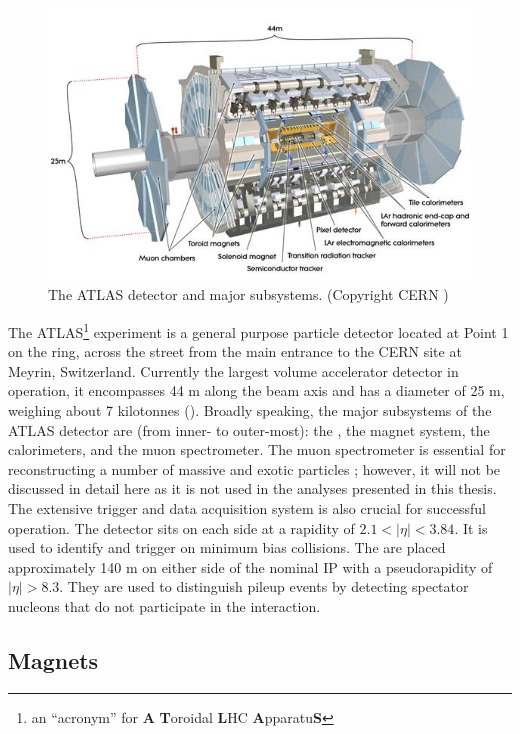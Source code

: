 \begin{figure}[t]
\includegraphics{ATLAS_layout.jpg}
\caption{The ATLAS detector and major subsystems. (Copyright CERN \cite{Pequenao:1095924})}
\label{fig:atlas_layout}
\end{figure}

The ATLAS\footnote{an ``acronym'' for \textbf{A} \textbf{T}oroidal \textbf{L}HC \textbf{A}pparatu\textbf{S}} experiment is a general purpose particle detector \cite{Aad:2008zzm} located at Point 1 on the \lhc ring, across the street from the main entrance to the CERN site at Meyrin, Switzerland.
Currently the largest volume accelerator detector in operation, it encompasses 44 m along the beam axis and has a diameter of 25 m, weighing about 7 kilotonnes ().
Broadly speaking, the major subsystems of the ATLAS detector are (from inner- to outer-most): the \id, the magnet system, the calorimeters, and the muon spectrometer.
The muon spectrometer is essential for reconstructing a number of massive and exotic particles \cite{ATLAS:1997ad}; however, it will not be discussed in detail here as it is not used in the analyses presented in this thesis.
The extensive trigger and data acquisition system is also crucial for successful operation.
The \mbts detector sits on each side at a rapidity of $2.1 < |\eta| < 3.84$.
It is used to identify and trigger on minimum bias collisions.
The \zdc are placed approximately 140 m on either side of the nominal \ac{IP} with a pseudorapidity of $|\eta| > 8.3$.
They are used to distinguish pileup events by detecting spectator nucleons that do not participate in the interaction.


\subsection{Magnets}
\label{subsec:atlas_magnet}

